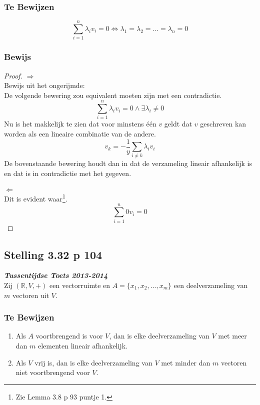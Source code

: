 \documentclass[lineaire_algebra_oplossingen.tex]{subfiles}
\begin{document}
\subsubsection*{Te Bewijzen}
\[
\sum_{i=1}^n\lambda_iv_i=0 \Leftrightarrow \lambda_1 = \lambda_2 = ... = \lambda_n = 0
\]

\subsubsection*{Bewijs}
\begin{proof}
\emph{$\Rightarrow$}\\
Bewijs uit het ongerijmde:\\
De volgende bewering zou equivalent moeten zijn met een contradictie.
\[
\sum_{i=1}^n\lambda_iv_i=0 \wedge \exists \lambda_i \neq 0
\]
Nu is het makkelijk te zien dat voor minstens \'e\'en $v$ geldt dat $v$ geschreven kan worden als een lineaire combinatie van de andere.
\[
v_k = -\frac{1}{y}\sum_{i\neq k}\lambda_iv_i
\]
De bovenstaande bewering houdt dan in dat de verzameling lineair afhankelijk is en dat is in contradictie met het gegeven.
\\\\
\emph{$\Leftarrow$}\\
Dit is evident waar\footnote{Zie Lemma 3.8 p 93 puntje 1.}.
\[
\sum_{i=1}^n0v_i=0
\]
\end{proof}


\subsection{Stelling 3.32 p 104}
\label{3.32}
\textit{\textbf{Tussentijdse Toets 2013-2014}}\\
Zij $(\mathbb{R},V,+)$ een vectorruimte en $A = \{x_1,x_2,...,x_m\}$ een deelverzameling van $m$ vectoren uit $V$.

\subsubsection*{Te Bewijzen}
\begin{enumerate}
\item
Als $A$ voortbrengend is voor $V$, dan is elke deelverzameling van $V$ met meer dan $m$ elementen lineair afhankelijk.
\item
Als $V$ vrij is, dan is elke deelverzameling van $V$ met minder dan $m$ vectoren niet voortbrengend voor $V$.
\end{enumerate}
\end{document}
